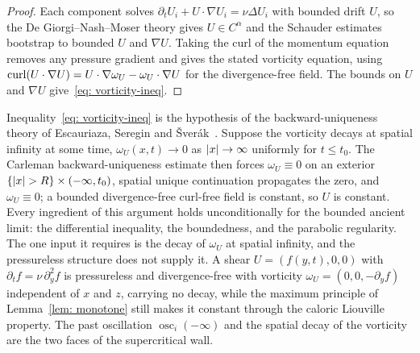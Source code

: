 \begin{proof}
Each component solves $\partial_t U_i + U\cdot\nabla U_i = \nu\Delta U_i$ with
bounded drift $U$, so the De Giorgi--Nash--Moser theory gives $U\in C^\alpha$ and the
Schauder estimates bootstrap to bounded $U$ and $\nabla U$. Taking the curl of the
momentum equation removes any pressure gradient and gives the stated vorticity
equation, using $\operatorname{curl}(U\cdot\nabla U) = U\cdot\nabla\omega_U - \omega_U\cdot\nabla U$
for the divergence-free field. The bounds on $U$ and $\nabla U$
give~\eqref{eq: vorticity-ineq}.
\end{proof}

Inequality~\eqref{eq: vorticity-ineq} is the hypothesis of the backward-uniqueness
theory of Escauriaza, Seregin and \v{S}ver\'ak~\cite{escauriaza-2003-bac-uni-par,
escauriaza-2003-l3i-nav-equ}. Suppose the vorticity decays at spatial infinity at
some time, $\omega_U(x,t)\to0$ as $\lvert x \rvert\to\infty$ uniformly for $t\le t_0$. The
Carleman backward-uniqueness estimate then forces $\omega_U\equiv0$ on an exterior
$\{\lvert x \rvert>R\}\times(-\infty,t_0)$, spatial unique continuation propagates the zero,
and $\omega_U\equiv0$; a bounded divergence-free curl-free field is constant, so $U$
is constant. Every ingredient of this argument holds unconditionally for the bounded
ancient limit: the differential inequality, the boundedness, and the parabolic
regularity. The one input it requires is the decay of $\omega_U$ at spatial infinity,
and the pressureless structure does not supply it. A shear $U = (f(y,t),0,0)$ with
$\partial_t f = \nu\,\partial_y^2 f$ is pressureless and divergence-free with
vorticity $\omega_U = (0,0,-\partial_y f)$ independent of $x$ and $z$, carrying no
decay, while the maximum principle of Lemma~\ref{lem: monotone} still makes it
constant through the caloric Liouville property. The past oscillation
$\operatorname{osc}_i(-\infty)$ and the spatial decay of the vorticity are the two
faces of the supercritical wall.

